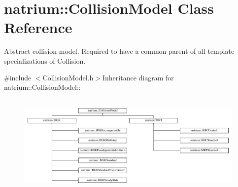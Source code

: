 \hypertarget{classnatrium_1_1CollisionModel}{
\section{natrium::CollisionModel Class Reference}
\label{classnatrium_1_1CollisionModel}
}


Abstract collision model. Required to have a common parent of all template specializations of Collision.  


{\ttfamily \#include $<$CollisionModel.h$>$}Inheritance diagram for natrium::CollisionModel::\begin{figure}[H]
\begin{center}
\leavevmode
\includegraphics[height=5cm]{classnatrium_1_1CollisionModel}
\end{center}
\end{figure}

